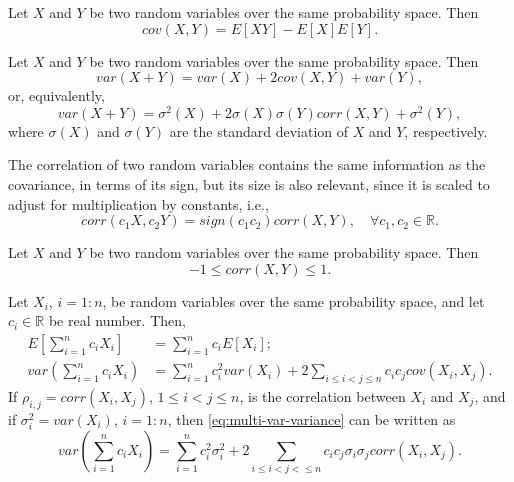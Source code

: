 \begin{lemma}
    Let $ X $ and $ Y $ be two random variables over the same probability space.
    Then
    \begin{equation}
        cov(X, Y) = E[XY] - E[X]E[Y].
    \end{equation}
\end{lemma}

\begin{lemma}
    Let $ X $ and $ Y $ be two random variables over the same probability space.
    Then
    \begin{equation}
        var(X + Y) = var(X) + 2 cov(X, Y) + var(Y),
    \end{equation}
    or, equivalently,
    \begin{equation}
        var(X + Y) = \sigma^2(X) + 2 \sigma(X) \sigma(Y) corr(X, Y) +
            \sigma^2(Y),
    \end{equation}
    where $ \sigma(X) $ and $ \sigma(Y) $ are the standard deviation of $ X $
        and $ Y $, respectively.
\end{lemma}

The correlation of two random variables contains the same information as the
    covariance, in terms of its sign, but its size is also relevant, since it
    is scaled to adjust for multiplication by constants, i.e.,
\begin{equation}
    corr(c_1 X, c_2 Y) = sign(c_1 c_2) corr(X, Y), \quad
        \forall c_1, c_2 \in \mathbb{R}.
\end{equation}

\begin{lemma}
    Let $ X $ and $ Y $ be two random variables over the same probability space.
    Then
    \begin{equation}
        -1 \leq corr(X, Y) \leq 1.
    \end{equation}
\end{lemma}

\begin{lemma}
    Let $ X_i $, $ i = 1 : n $, be random variables over the same probability
        space, and let $ c_i \in \mathbb{R} $ be real number.
    Then,
    \begin{align}
        E \left[ \sum_{i=1}^{n} c_i X_i \right] &=
            \sum_{i=1}^{n} c_i E[X_i]; \\
        var \left( \sum_{i=1}^{n} c_i X_i \right) &=
            \sum_{i=1}^{n} c_i^2 var(X_i) + 2 \sum_{i \leq i < j \leq n}
            c_i c_j cov(X_i, X_j).
        \label{eq:multi-var-variance}
    \end{align}
    If $ \rho_{i, j} = corr(X_i, X_j) $, $ 1 \leq i < j \leq n $, is the
        correlation between $ X_i $ and $ X_j $, and if
        $ \sigma_i^2 = var(X_i) $, $ i = 1 : n $, then
        \eqref{eq:multi-var-variance} can be written as
    \begin{equation}
        var \left( \sum_{i=1}^{n} c_i X_i \right) =
            \sum_{i=1}^{n} c_i^2 \sigma_i^2 +
            2 \sum_{i \leq i < j < \leq n} c_i c_j \sigma_i \sigma_j
            corr(X_i, X_j).
    \end{equation}
\end{lemma}
